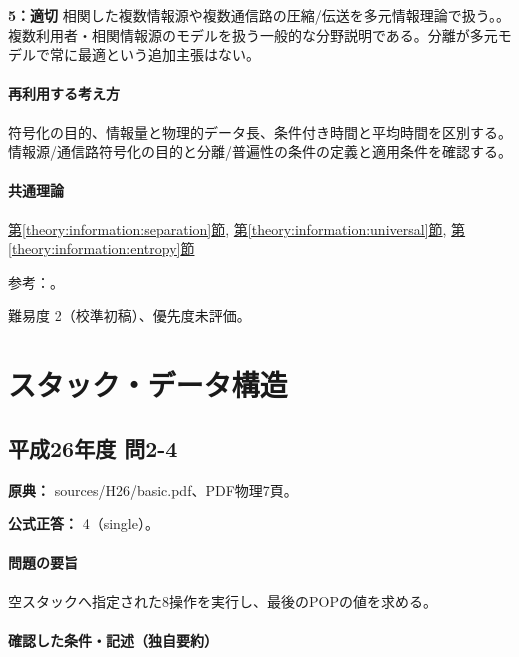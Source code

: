 \noindent\textbf{5：適切} 相関した複数情報源や複数通信路の圧縮/伝送を多元情報理論で扱う。。複数利用者・相関情報源のモデルを扱う一般的な分野説明である。分離が多元モデルで常に最適という追加主張はない。\par

\paragraph{再利用する考え方} 符号化の目的、情報量と物理的データ長、条件付き時間と平均時間を区別する。情報源/通信路符号化の目的と分離/普遍性の条件の定義と適用条件を確認する。

\paragraph{共通理論} \hyperref[theory:information:separation]{第\ref*{theory:information:separation}節}, \hyperref[theory:information:universal]{第\ref*{theory:information:universal}節}, \hyperref[theory:information:entropy]{第\ref*{theory:information:entropy}節}

\par 参考：\cite{info_separation,info_universal,info_lossless}。

\par 難易度 2（校準初稿）、優先度未評価。

\section{スタック・データ構造}

\subsection{平成26年度 問2-4}
\label{q:h26-reg-basic-2-4}

\noindent\textbf{原典：} sources/H26/basic.pdf、PDF物理7頁。

\textbf{公式正答：} 4（single）。

\paragraph{問題の要旨} 空スタックへ指定された8操作を実行し、最後のPOPの値を求める。

\paragraph{確認した条件・記述（独自要約）}\mbox{}\par

